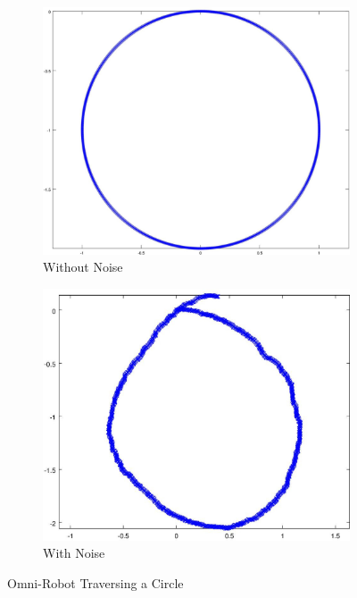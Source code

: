\documentclass{article}
\begin{document}
\begin{figure}[H]
	\centering
	\begin{subfigure}[b]{0.45\linewidth}
		\centering
		\includegraphics[width=\textwidth]{images/traverse_circle.jpg}
		\caption{Without Noise}
	\end{subfigure}
	\begin{subfigure}[b]{0.45\linewidth}
		\centering
		\includegraphics[width=\textwidth]{images/traverse_circle_with_noise.jpg}
		\caption{With Noise}
	\end{subfigure}
	\caption{Omni-Robot Traversing a Circle}
	\label{fig:omni_robot_circle}
\end{figure}
\end{document}
